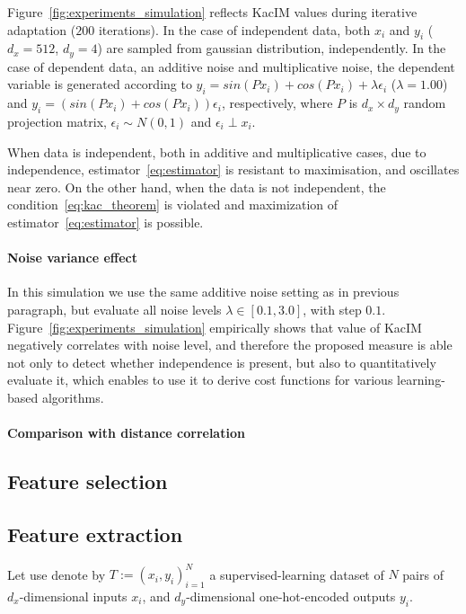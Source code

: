 \documentclass{article}
\begin{document}
Figure~\ref{fig:experiments_simulation} reflects KacIM values during iterative adaptation ($200$ iterations). In the case of independent data, both $x_{i}$ and $y_{i}$ ($d_{x} = 512$, $d_{y} = 4$) are sampled from gaussian distribution, independently. In the case of dependent data, an additive noise and multiplicative noise, the dependent variable is generated according to $y_{i} = sin(P x_{i}) + cos(P x_{i}) + \lambda \epsilon_{i}$ ($\lambda = 1.00$) and $y_{i} = (sin(P x_{i}) + cos(P x_{i})) \epsilon_{i}$, respectively, where $P$ is $d_{x} \times d_{y}$ random projection matrix, $\epsilon_{i} \sim N(0,1)$ and $\epsilon_{i} \perp x_{i}$.

When data is independent, both in additive and multiplicative cases, due to independence, estimator~\eqref{eq:estimator} is resistant to maximisation, and oscillates near zero. On the other hand, when the data is not independent, the condition~\eqref{eq:kac_theorem} is violated and maximization of estimator~\eqref{eq:estimator} is possible.
\paragraph{Noise variance effect} In this simulation we use the same additive noise setting as in previous paragraph, but evaluate all noise levels $\lambda \in [0.1, 3.0]$, with step $0.1$.
Figure~\ref{fig:experiments_simulation} empirically shows that value of KacIM  negatively correlates with noise level, and therefore the proposed measure is able not only to detect whether independence is present, but also to quantitatively evaluate it, which enables to use it to derive cost functions for various learning-based algorithms. 

\paragraph{Comparison with distance correlation}


\subsection{Feature selection}

\subsection{Feature extraction}
Let use denote by $T := (x_{i},y_{i})_{i=1}^{N}$ a supervised-learning dataset of $N$ pairs of $d_{x}$-dimensional inputs $x_{i}$, and $d_{y}$-dimensional one-hot-encoded outputs $y_{i}$.
\end{document}
